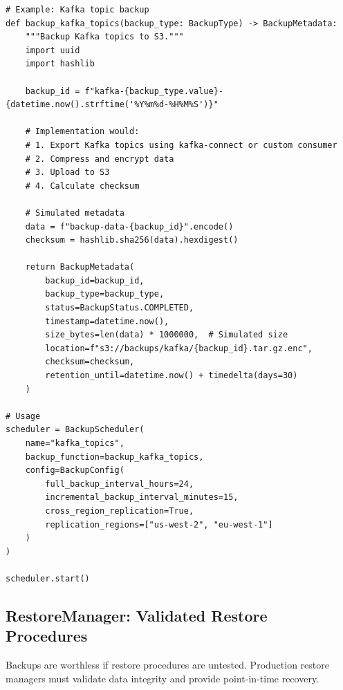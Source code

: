 \begin{lstlisting}[style=python, caption={Backup Scheduler with Retention Policies}]
# Example: Kafka topic backup
def backup_kafka_topics(backup_type: BackupType) -> BackupMetadata:
    """Backup Kafka topics to S3."""
    import uuid
    import hashlib

    backup_id = f"kafka-{backup_type.value}-{datetime.now().strftime('%Y%m%d-%H%M%S')}"

    # Implementation would:
    # 1. Export Kafka topics using kafka-connect or custom consumer
    # 2. Compress and encrypt data
    # 3. Upload to S3
    # 4. Calculate checksum

    # Simulated metadata
    data = f"backup-data-{backup_id}".encode()
    checksum = hashlib.sha256(data).hexdigest()

    return BackupMetadata(
        backup_id=backup_id,
        backup_type=backup_type,
        status=BackupStatus.COMPLETED,
        timestamp=datetime.now(),
        size_bytes=len(data) * 1000000,  # Simulated size
        location=f"s3://backups/kafka/{backup_id}.tar.gz.enc",
        checksum=checksum,
        retention_until=datetime.now() + timedelta(days=30)
    )

# Usage
scheduler = BackupScheduler(
    name="kafka_topics",
    backup_function=backup_kafka_topics,
    config=BackupConfig(
        full_backup_interval_hours=24,
        incremental_backup_interval_minutes=15,
        cross_region_replication=True,
        replication_regions=["us-west-2", "eu-west-1"]
    )
)

scheduler.start()
\end{lstlisting}

\subsection{RestoreManager: Validated Restore Procedures}

Backups are worthless if restore procedures are untested. Production restore managers must validate data integrity and provide point-in-time recovery.

